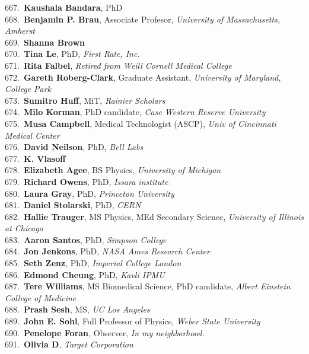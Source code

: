 667.~{\bf Kaushala Bandara}, PhD \\
668.~{\bf Benjamin P. Brau}, Associate Profesor, {\sl University of Massachusetts, Amherst} \\
669.~{\bf Shanna Brown} \\
670.~{\bf Tina Le}, PhD, {\sl First Rate, Inc.} \\
671.~{\bf Rita Falbel}, {\sl Retired from Weill Cornell Medical College} \\
672.~{\bf Gareth Roberg-Clark}, Graduate Assistant, {\sl University of Maryland, College Park} \\
673.~{\bf Sumitro Huff}, MiT, {\sl Rainier Scholars} \\
674.~{\bf Milo Korman}, PhD candidate, {\sl Case Western Reserve University} \\
675.~{\bf Musa Campbell}, Medical Technologist (ASCP), {\sl Univ of Cincinnati Medical Center} \\
676.~{\bf David Neilson}, PhD, {\sl Bell Labs} \\
677.~{\bf K. Vlasoff} \\
678.~{\bf Elizabeth Agee}, BS Physics, {\sl University of Michigan} \\
679.~{\bf Richard Owens}, PhD, {\sl Issara institute} \\
680.~{\bf Laura Gray}, PhD, {\sl Princeton University} \\
681.~{\bf Daniel Stolarski}, PhD, {\sl CERN} \\
682.~{\bf Hallie Trauger}, MS Physics, MEd Secondary Science, {\sl University of Illinois at Chicago} \\
683.~{\bf Aaron Santos}, PhD, {\sl Simpson College} \\
684.~{\bf Jon Jenkons}, PhD, {\sl NASA Ames Research Center} \\
685.~{\bf Seth Zenz}, PhD, {\sl Imperial College London} \\
686.~{\bf Edmond Cheung}, PhD, {\sl Kavli IPMU} \\
687.~{\bf Tere Williams}, MS Biomedical Science, PhD candidate, {\sl Albert Einstein College of Medicine} \\
688.~{\bf Prash Sesh}, MS, {\sl UC Los Angeles} \\
689.~{\bf John E. Sohl}, Full Professor of Physics, {\sl Weber State University} \\
690.~{\bf Penelope Foran}, Observer, {\sl In my neighborhood.} \\
691.~{\bf Olivia D}, {\sl Target Corporation } \\
